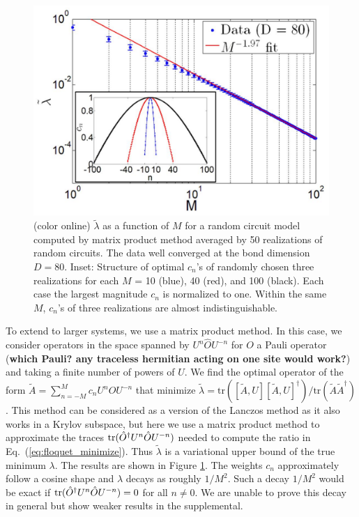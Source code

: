 \documentclass[twocolumn,superscriptaddress, prb]{revtex4-1}
\begin{document}
\begin{figure}
\includegraphics[width=1.0\linewidth]{random_circuit_MPO_inset.pdf}
\centering
\caption{ (color online) $\tilde{\lambda}$ as a function of $M$ for a random circuit model computed by matrix product method averaged by 50 realizations of random circuits. The data well converged at the bond dimension $D = 80$.
Inset: Structure of optimal $c_n$'s of randomly chosen three realizations for each $M$ = 10 (blue), 40 (red), and 100 (black). Each case the largest magnitude $c_n$ is normalized to one. Within the same $M$, $c_n$'s of three realizations are almost indistinguishable. }
\label{fig:mpo}
\end{figure}
To extend to larger systems, we use a matrix product method.  In this case, we consider operators in the space spanned by $U^n \hat{O} U^{-n}$ for $O$ a
Pauli operator ({\bf which Pauli? any traceless hermitian acting on one site would work?})
and taking a finite number of powers of $U$.  We find the optimal operator of the form $\tilde{A}=\sum_{n=-M}^M c_n U^n \hat{O} U^{-n}$
that minimize $\tilde{\lambda} = \mathrm{tr}([\tilde{A},U][\tilde{A},U]^\dag)/\mathrm{tr}(\tilde{A}\tilde{A}^\dag)$.
This method can be considered as a version of the Lanczos method as it also works in a Krylov subspace, but here we use a matrix product method to approximate the traces ${\rm tr}(\hat{O}^\dagger U^n \hat{O} U^{-n})$ needed to compute the ratio in Eq.~(\ref{eq:floquet_minimize}). 
Thus $\tilde{\lambda}$ is a variational upper bound of the true minimum $\lambda$. 
The results are shown in Figure \ref{fig:mpo}.
The weights $c_n$ approximately follow a cosine shape and $\lambda$ decays as roughly $1/M^2$.
Such a decay $1/M^2$ would be exact if
${\rm tr}(\hat{O}^\dagger U^n \hat{O} U^{-n})=0$ for all $n \neq 0$.
We are unable to prove this decay in general but show weaker results in the supplemental.
\end{document}
